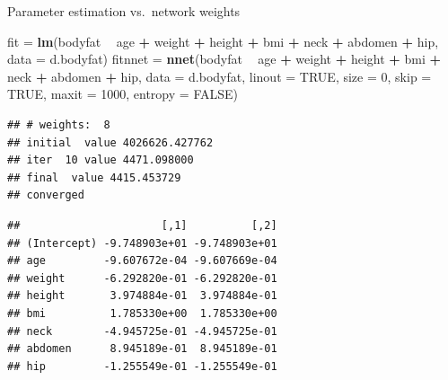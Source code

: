 \documentclass[10pt,ignorenonframetext,]{beamer}
\newenvironment{Shaded}{\begin{snugshade}}{\end{snugshade}}
\newcommand{\DataTypeTok}[1]{\textcolor[rgb]{0.13,0.29,0.53}{#1}}
\newcommand{\DecValTok}[1]{\textcolor[rgb]{0.00,0.00,0.81}{#1}}
\newcommand{\KeywordTok}[1]{\textcolor[rgb]{0.13,0.29,0.53}{\textbf{#1}}}
\newcommand{\NormalTok}[1]{#1}
\newcommand{\OperatorTok}[1]{\textcolor[rgb]{0.81,0.36,0.00}{\textbf{#1}}}
\newcommand{\OtherTok}[1]{\textcolor[rgb]{0.56,0.35,0.01}{#1}}
\newcommand{\StringTok}[1]{\textcolor[rgb]{0.31,0.60,0.02}{#1}}
\begin{document}
\begin{frame}[fragile]

\begin{block}{Parameter estimation vs.~network weights}

\scriptsize

\begin{Shaded}
\begin{Highlighting}[]
\NormalTok{fit =}\StringTok{ }\KeywordTok{lm}\NormalTok{(bodyfat }\OperatorTok{~}\StringTok{ }\NormalTok{age }\OperatorTok{+}\StringTok{ }\NormalTok{weight }\OperatorTok{+}\StringTok{ }\NormalTok{height }\OperatorTok{+}\StringTok{ }\NormalTok{bmi }\OperatorTok{+}\StringTok{ }\NormalTok{neck }\OperatorTok{+}\StringTok{ }\NormalTok{abdomen }\OperatorTok{+}\StringTok{ }\NormalTok{hip, }
    \DataTypeTok{data =}\NormalTok{ d.bodyfat)}
\NormalTok{fitnnet =}\StringTok{ }\KeywordTok{nnet}\NormalTok{(bodyfat }\OperatorTok{~}\StringTok{ }\NormalTok{age }\OperatorTok{+}\StringTok{ }\NormalTok{weight }\OperatorTok{+}\StringTok{ }\NormalTok{height }\OperatorTok{+}\StringTok{ }\NormalTok{bmi }\OperatorTok{+}\StringTok{ }\NormalTok{neck }\OperatorTok{+}\StringTok{ }\NormalTok{abdomen }\OperatorTok{+}\StringTok{ }
\StringTok{    }\NormalTok{hip, }\DataTypeTok{data =}\NormalTok{ d.bodyfat, }\DataTypeTok{linout =} \OtherTok{TRUE}\NormalTok{, }\DataTypeTok{size =} \DecValTok{0}\NormalTok{, }\DataTypeTok{skip =} \OtherTok{TRUE}\NormalTok{, }\DataTypeTok{maxit =} \DecValTok{1000}\NormalTok{, }
    \DataTypeTok{entropy =} \OtherTok{FALSE}\NormalTok{)}
\end{Highlighting}
\end{Shaded}

\begin{verbatim}
## # weights:  8
## initial  value 4026626.427762 
## iter  10 value 4471.098000
## final  value 4415.453729 
## converged
\end{verbatim}

\begin{Shaded}
\end{Shaded}

\begin{verbatim}
##                      [,1]          [,2]
## (Intercept) -9.748903e+01 -9.748903e+01
## age         -9.607672e-04 -9.607669e-04
## weight      -6.292820e-01 -6.292820e-01
## height       3.974884e-01  3.974884e-01
## bmi          1.785330e+00  1.785330e+00
## neck        -4.945725e-01 -4.945725e-01
## abdomen      8.945189e-01  8.945189e-01
## hip         -1.255549e-01 -1.255549e-01
\end{verbatim}

\end{block}

\end{frame}
\end{document}
